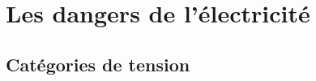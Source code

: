 

\begin{comment}

\documentclass[a4paper, 11pt, twoside, fleqn]{memoir}

\usepackage{AOCDTF}



	\openleft %

\end{comment}

\chapter{Les dangers de l'électricité}
\label{chap:dangers_electricite}
\ChapFrame %

\section{Catégories de tension}

